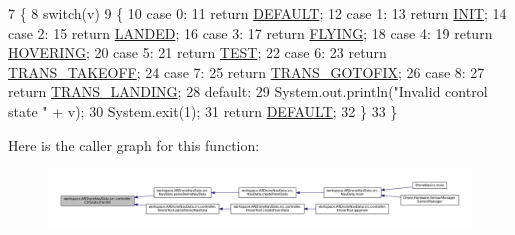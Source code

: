 \begin{DoxyCode}
7     \{
8         \textcolor{keywordflow}{switch}(v)
9         \{
10         \textcolor{keywordflow}{case} 0:
11             \textcolor{keywordflow}{return} \hyperlink{enumworkspace_1_1_a_r_drone_nav_data_1_1src_1_1controller_1_1_ctrl_state_a11f5358850776e864fd2b9b41d16bd01}{DEFAULT};
12         \textcolor{keywordflow}{case} 1:
13             \textcolor{keywordflow}{return} \hyperlink{enumworkspace_1_1_a_r_drone_nav_data_1_1src_1_1controller_1_1_ctrl_state_ac0c37bcebc4cac0ffcf936038c66e192}{INIT};
14         \textcolor{keywordflow}{case} 2:
15             \textcolor{keywordflow}{return} \hyperlink{enumworkspace_1_1_a_r_drone_nav_data_1_1src_1_1controller_1_1_ctrl_state_afd1cd7a74bb1b365d575b7b113cdd345}{LANDED};
16         \textcolor{keywordflow}{case} 3:
17             \textcolor{keywordflow}{return} \hyperlink{enumworkspace_1_1_a_r_drone_nav_data_1_1src_1_1controller_1_1_ctrl_state_a1abd0793f37fa1dcb5910b981f1ba1c0}{FLYING};
18         \textcolor{keywordflow}{case} 4:
19             \textcolor{keywordflow}{return} \hyperlink{enumworkspace_1_1_a_r_drone_nav_data_1_1src_1_1controller_1_1_ctrl_state_aa506078421e4eee0e30aa759ea7b1f30}{HOVERING};
20         \textcolor{keywordflow}{case} 5:
21             \textcolor{keywordflow}{return} \hyperlink{enumworkspace_1_1_a_r_drone_nav_data_1_1src_1_1controller_1_1_ctrl_state_a791ab056664ab06886d2aee5e47fda32}{TEST};
22         \textcolor{keywordflow}{case} 6:
23             \textcolor{keywordflow}{return} \hyperlink{enumworkspace_1_1_a_r_drone_nav_data_1_1src_1_1controller_1_1_ctrl_state_ae3c0f7718462c6ffa0d4dbf8f9de6764}{TRANS\_TAKEOFF};
24         \textcolor{keywordflow}{case} 7:
25             \textcolor{keywordflow}{return} \hyperlink{enumworkspace_1_1_a_r_drone_nav_data_1_1src_1_1controller_1_1_ctrl_state_ae3b43c075164218665e83ea9a5665377}{TRANS\_GOTOFIX};
26         \textcolor{keywordflow}{case} 8:
27             \textcolor{keywordflow}{return} \hyperlink{enumworkspace_1_1_a_r_drone_nav_data_1_1src_1_1controller_1_1_ctrl_state_acf5e902d499c2a78ea010a7f2496a37f}{TRANS\_LANDING};
28         \textcolor{keywordflow}{default}:
29             System.out.println(\textcolor{stringliteral}{"Invalid control state "} + v);
30             System.exit(1);
31             \textcolor{keywordflow}{return} \hyperlink{enumworkspace_1_1_a_r_drone_nav_data_1_1src_1_1controller_1_1_ctrl_state_a11f5358850776e864fd2b9b41d16bd01}{DEFAULT};
32         \}
33     \}
\end{DoxyCode}


Here is the caller graph for this function\+:\nopagebreak
\begin{figure}[H]
\begin{center}
\leavevmode
\includegraphics[width=350pt]{enumworkspace_1_1_a_r_drone_nav_data_1_1src_1_1controller_1_1_ctrl_state_a12e972814c520c7a3da99809b3c7973b_icgraph}
\end{center}
\end{figure}





